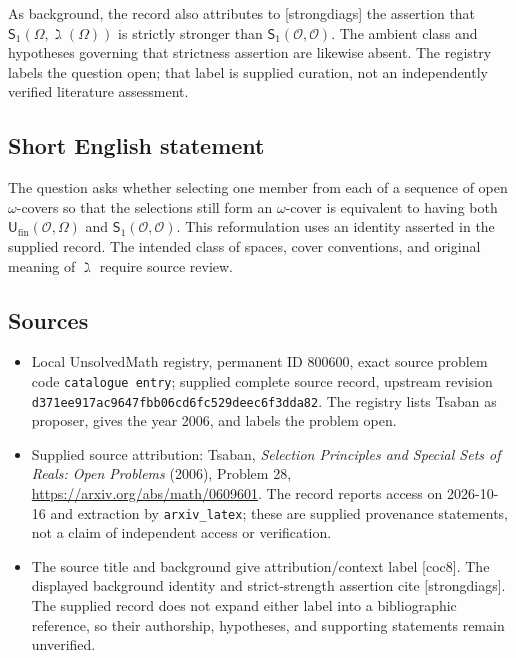 \documentclass[11pt]{article}
\begin{document}
As background, the record also attributes to [strongdiags] the assertion that \(\mathsf S_1(\Omega,\gimel(\Omega))\) is strictly stronger than \(\mathsf S_1(\mathcal O,\mathcal O)\). The ambient class and hypotheses governing that strictness assertion are likewise absent. The registry labels the question open; that label is supplied curation, not an independently verified literature assessment.
\subsection{Short English statement}
The question asks whether selecting one member from each of a sequence of open \(\omega\)-covers so that the selections still form an \(\omega\)-cover is equivalent to having both \(\mathsf U_{\mathrm{fin}}(\mathcal O,\Omega)\) and \(\mathsf S_1(\mathcal O,\mathcal O)\). This reformulation uses an identity asserted in the supplied record. The intended class of spaces, cover conventions, and original meaning of \(\gimel\) require source review.
\subsection{Sources}
\begin{itemize}
\item Local UnsolvedMath registry, permanent ID \(800600\), exact source problem code \texttt{catalogue entry}; supplied complete source record, upstream revision \texttt{d371ee917ac9647fbb06cd6fc529deec6f3dda82}. The registry lists Tsaban as proposer, gives the year 2006, and labels the problem open.
\item Supplied source attribution: Tsaban, \emph{Selection Principles and Special Sets of Reals: Open Problems} (2006), Problem 28, \url{https://arxiv.org/abs/math/0609601}. The record reports access on 2026-10-16 and extraction by \texttt{arxiv\_latex}; these are supplied provenance statements, not a claim of independent access or verification.
\item The source title and background give attribution/context label [coc8]. The displayed background identity and strict-strength assertion cite [strongdiags]. The supplied record does not expand either label into a bibliographic reference, so their authorship, hypotheses, and supporting statements remain unverified.
\end{itemize}
\end{document}
